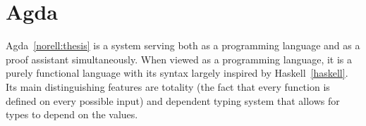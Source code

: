 \usepackage{amstext}
\usepackage{amssymb}
\usepackage{stmaryrd}


\newcommand{\redFG}[1]{\textcolor[rgb]{0.6,0,0}{#1}}
\newcommand{\greenFG}[1]{\textcolor[rgb]{0,0.4,0}{#1}}
\newcommand{\blueFG}[1]{\textcolor[rgb]{0,0,0.8}{#1}}
\newcommand{\orangeFG}[1]{\textcolor[rgb]{0.8,0.4,0}{#1}}
\newcommand{\purpleFG}[1]{\textcolor[rgb]{0.4,0,0.4}{#1}}
\newcommand{\yellowFG}[1]{\textcolor{yellow}{#1}}
\newcommand{\brownFG}[1]{\textcolor[rgb]{0.5,0.2,0.2}{#1}}
\newcommand{\blackFG}[1]{\textcolor[rgb]{0,0,0}{#1}}
\newcommand{\whiteFG}[1]{\textcolor[rgb]{1,1,1}{#1}}
\newcommand{\yellowBG}[1]{\colorbox[rgb]{1,1,0.2}{#1}}
\newcommand{\brownBG}[1]{\colorbox[rgb]{1.0,0.7,0.4}{#1}}

\newcommand{\ColourStuff}{
  \newcommand{\red}{\redFG}
  \newcommand{\green}{\greenFG}
  \newcommand{\blue}{\blueFG}
  \newcommand{\orange}{\orangeFG}
  \newcommand{\purple}{\purpleFG}
  \newcommand{\yellow}{\yellowFG}
  \newcommand{\brown}{\brownFG}
  \newcommand{\black}{\blackFG}
  \newcommand{\white}{\whiteFG}
}

\newcommand{\MonochromeStuff}{
  \newcommand{\red}{\blackFG}
  \newcommand{\green}{\blackFG}
  \newcommand{\blue}{\blackFG}
  \newcommand{\orange}{\blackFG}
  \newcommand{\purple}{\blackFG}
  \newcommand{\yellow}{\blackFG}
  \newcommand{\brown}{\blackFG}
  \newcommand{\black}{\blackFG}
  \newcommand{\white}{\blackFG}
}

\MonochromeStuff

\newcommand{\K}[1]{\yellow{\mathsf{#1}}}
\newcommand{\Q}[1]{\green{\mathsf{#1}}}
\newcommand{\D}[1]{\blue{\mathsf{#1}}}
\newcommand{\C}[1]{\red{\mathsf{#1}}}
\newcommand{\F}[1]{\green{\mathsf{#1}}}
\newcommand{\V}[1]{\purple{\mathit{#1}}}

\newcommand{\dfeq}{\overset{\mathrm{df}}{=}}


\section{Agda\label{sec:Agda-background}}

Agda~\ref{norell:thesis} is a system serving both as a programming language and as a proof assistant simultaneously.
When viewed as a programming language, it is a purely functional language with its syntax largely inspired by 
Haskell~\ref{haskell}. Its main distinguishing features are totality (the fact that every function is defined 
on every possible input) and dependent typing system that allows for types to depend on the values.

